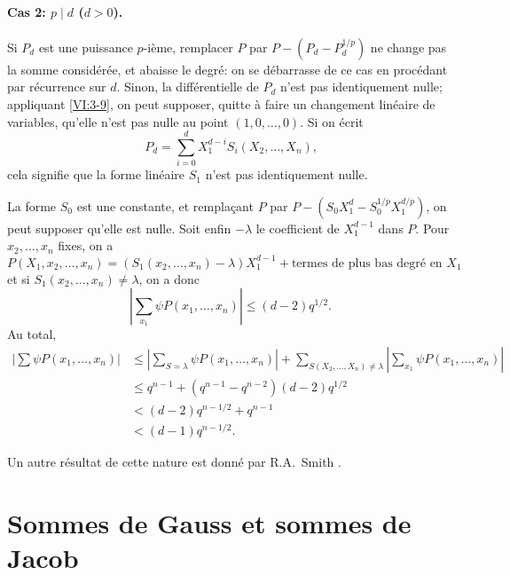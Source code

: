 \paragraph{Cas 2: $p\mid d$ ($d>0$).}
Si $P_d$ est une puissance $p$-ième, remplacer $P$ par $P-(P_d-P_d^{1/p})$ ne 
change pas la somme considérée, et abaisse le degré: on se débarrasse de 
ce cas en procédant par récurrence sur $d$. Sinon, la différentielle de 
$P_d$ n'est pas identiquement nulle; appliquant \ref{VI:3-9}, on peut supposer, 
quitte à faire un changement linéaire de variables, qu'elle n'est pas nulle 
au point $(1,0,\dots,0)$. Si on écrit 
\[
  P_d = \sum_{i=0}^d X_1^{d-i} S_i(X_2,\dots,X_n) \text{,} 
\]
cela signifie que la forme linéaire $S_1$ n'est pas identiquement nulle. 

La forme $S_0$ est une constante, et remplaçant $P$ par 
$P-(S_0 X_1^d -S_0^{1/p} X_1^{d/p})$, on peut supposer qu'elle est nulle. Soit 
enfin $-\lambda$ le coefficient de $X_1^{d-1}$ dans $P$. Pour $x_2,\dots,x_n$ 
fixes, on a 
\[
  P(X_1,x_2,\dots,x_n) = (S_1(x_2,\dots,x_n)-\lambda) X_1^{d-1} + \text{termes de plus bas degré en $X_1$} 
\]
et si $S_1(x_2,\dots,x_n)\ne \lambda$, on a donc 
\[
  \left| \sum_{x_1} \psi P(x_1,\dots,x_n)\right| \leqslant (d-2) q^{1/2} \text{.} 
\]
Au total, 
\begin{align*}
  \left|\sum \psi P(x_1,\dots,x_n)\right| 
    &\leqslant \left|\sum_{S=\lambda} \psi P(x_1,\dots,x_n)\right| + \sum_{S(X_2,\dots,X_n)\ne\lambda} \left| \sum_{x_1} \psi P(x_1,\dots,x_n)\right| \\
    &\leqslant q^{n-1} + (q^{n-1}-q^{n-2})(d-2) q^{1/2} \\
    &< (d-2) q^{n-1/2} + q^{n-1} \\
    &< (d-1) q^{n-1/2} \text{.}
\end{align*}

Un autre résultat de cette nature est donné par R.A.\ Smith 
\cite{sm70}. 










\section{Sommes de Gauss et sommes de Jacob}\label{VI:4}





\subsection{}\label{VI:4-1}

